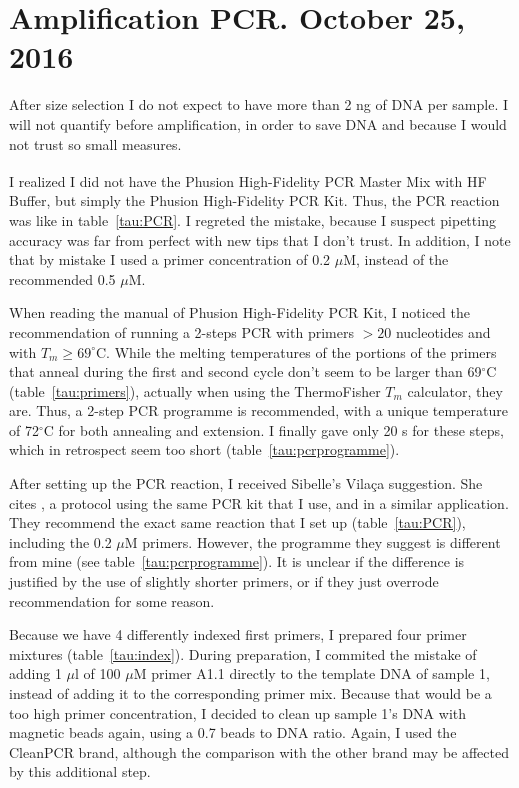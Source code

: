 \documentclass[a4paper,12pt]{article}
\begin{document}
\section{Amplification PCR. October 25, 2016}
After size selection I do not expect to have more than 2 ng of DNA per sample. I will not quantify before amplification, in order to save DNA and because I would not trust so small measures.

I realized I did not have the Phusion\textsuperscript{\textregistered} High-Fidelity PCR Master Mix with HF Buffer, but simply the Phusion High-Fidelity PCR Kit. Thus, the PCR reaction was like in table~\ref{tau:PCR}. I regreted the mistake, because I suspect pipetting accuracy was far from perfect with new tips that I don't trust. In addition, I note that by mistake I used a primer concentration of 0.2 $\mu$M, instead of the recommended 0.5 $\mu$M.

When reading the manual of Phusion High-Fidelity PCR Kit, I noticed the recommendation of running a 2-steps PCR with primers $>20$ nucleotides and with $T_m \ge 69^\circ$C. While the melting temperatures of the portions of the primers that anneal during the first and second cycle don't seem to be larger than 69$^\circ$C (table~\ref{tau:primers}), actually when using the ThermoFisher $T_m$ calculator, they are. Thus, a 2-step PCR programme is recommended, with a unique temperature of 72$^\circ$C for both annealing and extension. I finally gave only 20 s for these steps, which in retrospect seem too short (table~\ref{tau:pcrprogramme}).

After setting up the PCR reaction, I received Sibelle's Vilaça suggestion. She cites \citet{Meyer2010}, a protocol using the same PCR kit that I use, and in a similar application. They recommend the exact same reaction that I set up (table~\ref{tau:PCR}), including the 0.2 $\mu$M primers. However, the programme they suggest is different from mine (see table~\ref{tau:pcrprogramme}). It is unclear if the difference is justified by the use of slightly shorter primers, or if they just overrode \citet{Meyer2010} recommendation for some reason.

Because we have 4 differently indexed first primers, I prepared four primer mixtures (table~\ref{tau:index}). During preparation, I commited the mistake of adding 1 $\mu$l of 100 $\mu$M primer A1.1 directly to the template DNA of sample 1, instead of adding it to the corresponding primer mix. Because that would be a too high primer concentration, I decided to clean up sample 1's DNA with magnetic beads again, using a 0.7 beads to DNA ratio. Again, I used the CleanPCR brand, although the comparison with the other brand may be affected by this additional step.
\end{document}

